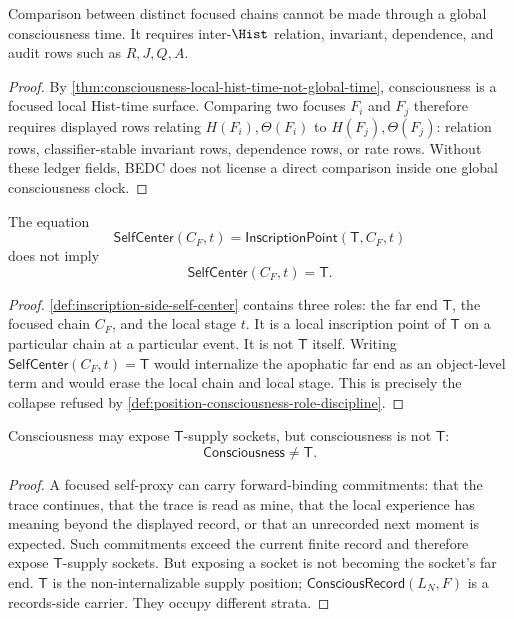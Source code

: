 \begin{corollary}
\label{cor:other-consciousness-comparison-requires-relation-rows}
Comparison between distinct focused chains cannot be made through a global
consciousness time. It requires inter-$\Hist$ relation, invariant,
dependence, and audit rows such as $R,J,Q,A$.
\end{corollary}

\begin{proof}
By \autoref{thm:consciousness-local-hist-time-not-global-time},
consciousness is a focused local Hist-time surface. Comparing two focuses
$F_i$ and $F_j$ therefore requires displayed rows relating
$H(F_i),\Theta(F_i)$ to $H(F_j),\Theta(F_j)$: relation rows, classifier-stable
invariant rows, dependence rows, or rate rows. Without these ledger fields,
BEDC does not license a direct comparison inside one global consciousness
clock.
\end{proof}

\begin{theorem}
\label{thm:selfcenter-local-inscription-not-t}
The equation
$$
\mathsf{SelfCenter}(C_F,t)
=
\mathsf{InscriptionPoint}(\mathsf{T},C_F,t)
$$
does not imply
$$
\mathsf{SelfCenter}(C_F,t)=\mathsf{T}.
$$
\end{theorem}

\begin{proof}
\autoref{def:inscription-side-self-center} contains three roles: the far
end $\mathsf{T}$, the focused chain $C_F$, and the local stage $t$. It is a
local inscription point of $\mathsf{T}$ on a particular chain at a
particular event. It is not $\mathsf{T}$ itself. Writing
$\mathsf{SelfCenter}(C_F,t)=\mathsf{T}$ would internalize the apophatic far
end as an object-level term and would erase the local chain and local
stage. This is precisely the collapse refused by
\autoref{def:position-consciousness-role-discipline}.
\end{proof}

\begin{corollary}
\label{cor:consciousness-exposes-t-sockets-not-t}
Consciousness may expose $\mathsf{T}$-supply sockets, but consciousness is
not $\mathsf{T}$:
$$
\mathsf{Consciousness}\neq\mathsf{T}.
$$
\end{corollary}

\begin{proof}
A focused self-proxy can carry forward-binding commitments: that the trace
continues, that the trace is read as mine, that the local experience has
meaning beyond the displayed record, or that an unrecorded next moment is
expected. Such commitments exceed the current finite record and therefore
expose $\mathsf{T}$-supply sockets. But exposing a socket is not becoming
the socket's far end. $\mathsf{T}$ is the non-internalizable supply
position; $\mathsf{ConsciousRecord}(L_N,F)$ is a records-side carrier.
They occupy different strata.
\end{proof}

